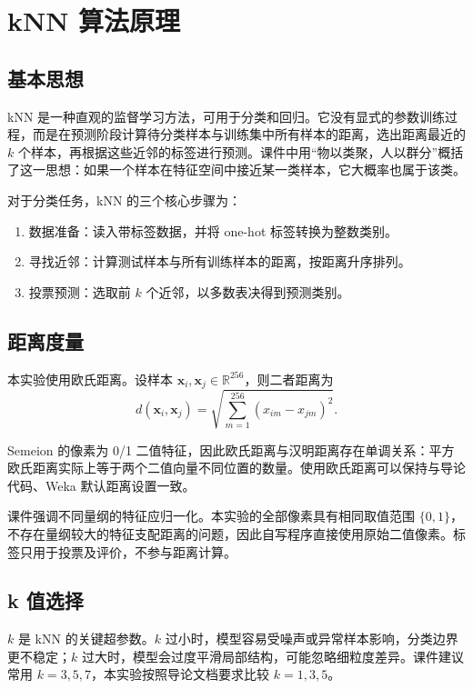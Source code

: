 \documentclass[UTF8,zihao=-4]{ctexart}
\begin{document}
\section{kNN 算法原理}

\subsection{基本思想}

kNN 是一种直观的监督学习方法，可用于分类和回归。它没有显式的参数训练过程，而是在预测阶段计算待分类样本与训练集中所有样本的距离，选出距离最近的 $k$ 个样本，再根据这些近邻的标签进行预测。课件中用“物以类聚，人以群分”概括了这一思想：如果一个样本在特征空间中接近某一类样本，它大概率也属于该类。

对于分类任务，kNN 的三个核心步骤为：

\begin{enumerate}[label=\arabic*.]
  \item 数据准备：读入带标签数据，并将 one-hot 标签转换为整数类别。
  \item 寻找近邻：计算测试样本与所有训练样本的距离，按距离升序排列。
  \item 投票预测：选取前 $k$ 个近邻，以多数表决得到预测类别。
\end{enumerate}

\subsection{距离度量}

本实验使用欧氏距离。设样本 $\mathbf{x}_i,\mathbf{x}_j \in \mathbb{R}^{256}$，则二者距离为
\[
  d(\mathbf{x}_i,\mathbf{x}_j)
  =
  \sqrt{\sum_{m=1}^{256}(x_{im}-x_{jm})^2}.
\]

Semeion 的像素为 0/1 二值特征，因此欧氏距离与汉明距离存在单调关系：平方欧氏距离实际上等于两个二值向量不同位置的数量。使用欧氏距离可以保持与导论代码、Weka 默认距离设置一致。

课件强调不同量纲的特征应归一化。本实验的全部像素具有相同取值范围 $\{0,1\}$，不存在量纲较大的特征支配距离的问题，因此自写程序直接使用原始二值像素。标签只用于投票及评价，不参与距离计算。

\subsection{k 值选择}

$k$ 是 kNN 的关键超参数。$k$ 过小时，模型容易受噪声或异常样本影响，分类边界更不稳定；$k$ 过大时，模型会过度平滑局部结构，可能忽略细粒度差异。课件建议常用 $k=3,5,7$，本实验按照导论文档要求比较 $k=1,3,5$。
\end{document}
